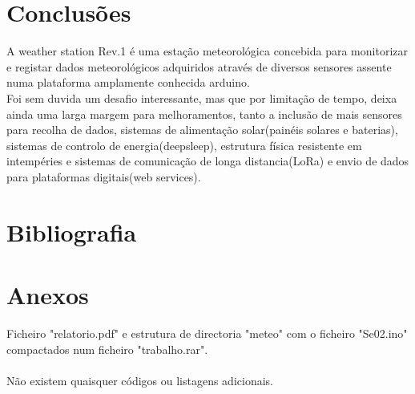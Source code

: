 \documentclass[12pt,a4paper,portrait]{article}
\begin{document}
	\section{Conclusões}
	A weather station Rev.1 é uma estação meteorológica concebida para monitorizar e registar dados meteorológicos adquiridos através de diversos sensores assente numa plataforma amplamente conhecida arduino.\\
	Foi sem duvida um desafio interessante, mas que por limitação de tempo, deixa ainda uma larga margem para melhoramentos, tanto a inclusão de mais sensores para recolha de dados, sistemas de alimentação solar(painéis solares e baterias), sistemas de controlo de energia(deepsleep), estrutura física resistente em intempéries e sistemas de comunicação de longa distancia(LoRa) e envio de dados para plataformas digitais(web services).\\
	
	\newpage
	\section{Bibliografia}
	
	
	
	\newpage
	\section{Anexos}
	Ficheiro "relatorio.pdf" e estrutura de directoria "meteo" com o ficheiro "Se\textunderscore 02.ino" compactados num ficheiro "trabalho.rar".\\\\
	Não existem quaisquer códigos ou listagens adicionais.					
\end{document}
